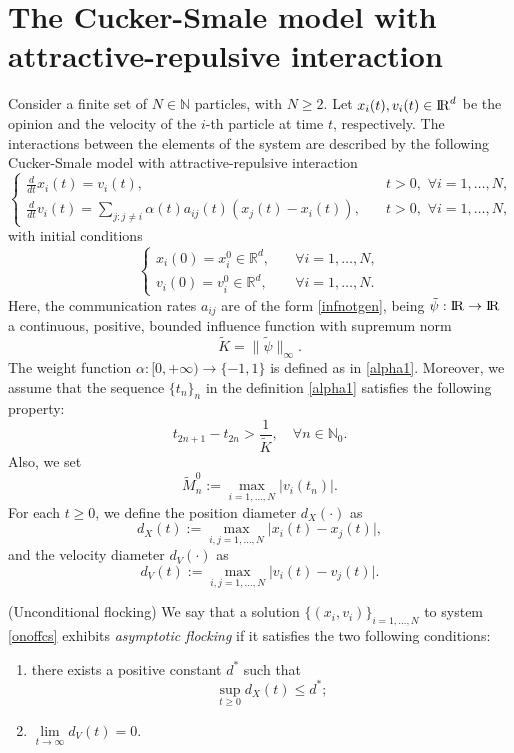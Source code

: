 \documentclass[a4paper,11pt,oneside]{article}
\newcommand{\N}{\mathbb N}
\newcommand{\RR}{{{\rm I} \kern -.15em {\rm R} }}
\begin{document}
\section{The Cucker-Smale model with attractive-repulsive interaction}
Consider a finite set of $N\in\N$ particles, with $N\geq 2 $. Let $x_{i}(t),v_{i}(t)\in \RR^d$ be the opinion and the velocity of the $i$-th particle at time $t$, respectively. The interactions between the elements of the system are described by the following  Cucker-Smale model with attractive-repulsive interaction
\begin{equation}\label{onoffcs}
	\begin{cases}
		\frac{d}{dt}x_{i}(t)=v_{i}(t),&\quad t>0,	\,\,\forall i=1,\dots,N,\\\frac{d}{dt}v_{i}(t)=\underset{j:j\neq i}{\sum}\alpha(t) a_{ij}(t)(x_{j}(t)-x_{i}(t)),&\quad t>0,	\,\,\forall i=1,\dots,N,
	\end{cases}
\end{equation}
with initial conditions
\begin{equation}\label{incondcs}
	\begin{cases}
		x_{i}(0)=x^{0}_{i}\in \mathbb{R}^{d},&\quad \forall i=1,\dots,N,\\v_{i}(0)=v^{0}_{i}\in \mathbb{R}^{d},&\quad \forall i=1,\dots,N.
	\end{cases}		
\end{equation}
Here, the communication rates $a_{ij}$ are of the form \eqref{infnotgen}, being $\tilde\psi:\RR\rightarrow \RR$ a continuous, positive, bounded influence function with supremum norm
$$\tilde{K}=\lVert\tilde\psi\rVert_{\infty}. $$The weight function $\alpha:[0,+\infty)\rightarrow\{-1,1\}$ is defined as in \eqref{alpha1}. Moreover, we assume that the sequence $\{t_n\}_n$ in the definition \eqref{alpha1} satisfies the following property:
\begin{equation}\label{tnbuoni}
	t_{2n+1}-t_{2n}>\frac{1}{\tilde K},\quad \forall n\in \mathbb{N}_0.
\end{equation}
Also, we set
\begin{equation}\label{tildeM0}
	\tilde{M}_{n}^{0}:=\max_{i=1,\dots,N}\lvert v_{i}(t_{n})\rvert.
\end{equation}
For each $t\geq 0$, we define the position diameter $d_{X}(\cdot)$ as
$$d_{X}(t):=\max_{i,j=1,\dots,N}\lvert x_{i}(t)-x_{j}(t)\rvert,$$
and the velocity diameter $d_{V}(\cdot)$ as $$d_{V}(t):=\max_{i,j=1,\dots,N}\lvert v_{i}(t)-v_{j}(t)\rvert.$$
\begin{defn} (Unconditional flocking)\label{unflock} We say that a solution $\{(x_{i},v_{i})\}_{i=1,\dots,N}$ to system \eqref{onoffcs} exhibits \textit{asymptotic flocking} if it satisfies the two following conditions:
	\begin{enumerate}
		\item there exists a positive constant $d^{*}$ such that$$\sup_{t\geq0}d_{X}(t)\leq d^{*};$$
		\item$\underset{t \to\infty}{\lim}d_{V}(t)=0.$
	\end{enumerate}
\end{defn}
\end{document}

